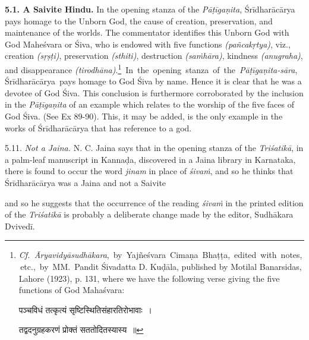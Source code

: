 \documentclass[10pt, openany]{book}
\begin{document}
{\textbf{5.1. A Saivite Hindu.} In the opening stanza of the} 
{\textit{Pāṭīgaṇita}, Śrīdharācārya pays homage to the Unborn God, the}
{cause of creation, preservation, and maintenance of the worlds.}
{The commentator identifies this Unborn God with God} 
{Maheśvara or Śiva, who is endowed with five functions}
{\textit{(pañcakṛtya)}, viz., creation \textit{(sṛṣṭi)}, preservation
\textit{(sthiti)}, destruction \textit{(saṁhāra)}, kindness \textit{(anugraha)}, and disappearance
{\textit{(tirodhāna)}.\renewcommand{\thefootnote}{1}\footnote{\hspace{-2mm} \englishfont \textit{Cf. \,Āryavidyāsudhākara}, \,by \,Yajñeśvara \,Cimaṇa \,Bhaṭṭa, \,edited \,with \,{notes, \,etc., \,by \,MM. \,Pandit Śivadatta D. Kuḍāla, published by
Motilal}
{Banarsidas, Lahore (1923), p. 131, where we have the following verse}
{giving the five functions of God Mahaśvara:}\\
\vspace{-0.1mm}

\hspace{6mm} {\qt पञ्चविधं तत्कृत्यं सृष्टिस्थितिसंहारतिरोभावाः~। \\
\vspace{-0.1mm}

\hspace{5mm} तद्वदनुग्रहकरणं प्रोक्तं सततोदितस्यास्य~॥}
} \,In \,the \,opening \,stanza \,of \,the \,\textit{Pāṭīgaṇita-sāra}, \,Śrīdharācārya \,pays homage to God Śiva by name. Hence it is clear}
{that he was a devotee of God Śiva. This conclusion is}
{furthermore corroborated by the inclusion in the \textit{Pāṭīgaṇita} of}
{an example which relates to the worship of the five faces of}
{God Śiva. (See Ex 89-90). This, it may be added, is the}
{only example in the works of Śrīdharācārya that has reference}
{to a god.}}
\vspace{3mm}

{5.11. \textit{Not a Jaina.}{ N. C. Jaina says that in the}
{opening stanza of the \textit{Triśatikā}, in a palm-leaf manuscript in}
{Kannaḍa, discovered in a Jaina library in Karnataka,} 
{there is found to occur the word \textit{jinam} in place of \textit{śivaṁ}, and}
{so he thinks that Śrīdharācārya was a Jaina and not a Saivite}}

\newpage

\justify{}
{and so he suggests that the occurrence of the reading \textit{śivaṁ} in}
{the printed edition of the \textit{Triśatikā} is probably a deliberate}
{change made by the editor, Sudhākara Dvivedī.}
\end{document}
